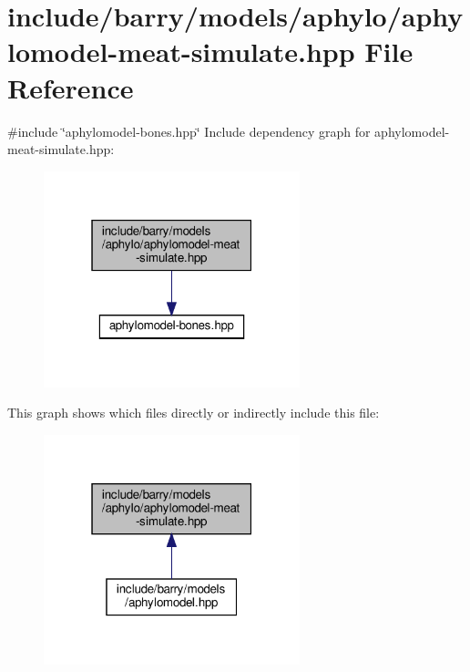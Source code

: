 \hypertarget{aphylomodel-meat-simulate_8hpp}{}\section{include/barry/models/aphylo/aphylomodel-\/meat-\/simulate.hpp File Reference}
\label{aphylomodel-meat-simulate_8hpp}
{\ttfamily \#include \char`\"{}aphylomodel-\/bones.\+hpp\char`\"{}}\newline
Include dependency graph for aphylomodel-\/meat-\/simulate.hpp\+:\nopagebreak
\begin{figure}[H]
\begin{center}
\leavevmode
\includegraphics[width=211pt]{aphylomodel-meat-simulate_8hpp__incl}
\end{center}
\end{figure}
This graph shows which files directly or indirectly include this file\+:\nopagebreak
\begin{figure}[H]
\begin{center}
\leavevmode
\includegraphics[width=211pt]{aphylomodel-meat-simulate_8hpp__dep__incl}
\end{center}
\end{figure}
